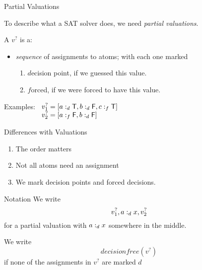 \documentclass[xetex,aspectratio=169,14pt,hyperref={pdfpagelabels=true,pdflang={en-GB}}]{beamer}
\begin{document}
\begin{frame}
  {Partial Valuations}

  To describe what a SAT solver does, we need \emph{partial valuations}.

  \bigskip

  A  $v^?$ is a:
  \begin{itemize}
  \item \emph{sequence} of assignments to atoms; with each one marked
    \begin{enumerate}
    \item $d$ecision point, if we guessed this value.
    \item $f$orced, if we were forced to have this value.
    \end{enumerate}
  \end{itemize}

\medskip

  Examples:
  $\begin{array}[t]{l}
      v_1^? = [ a :_d \mathsf{T}, b :_d \mathsf{F}, c :_f \mathsf{T} ] \\
      v_2^? = [ a :_f \mathsf{F}, b :_d \mathsf{F} ] \\
    \end{array}$
\end{frame}

\begin{frame}
  {Differences with Valuations}

  \begin{enumerate}
  \item The order matters\\
  \item Not all atoms need an assignment\\
  \item We mark decision points and forced decisions.
  \end{enumerate}
\end{frame}

\begin{frame}
  {Notation}
  We write
  \begin{displaymath}
    v_1^?, a :_d x, v_2^?
  \end{displaymath}
  for a partial valuation with $a :_d x$ somewhere in
  the middle.

  \bigskip

  We write
  \begin{displaymath}
    \mathit{decisionfree}(v^?)
  \end{displaymath}
  if none of the assignments in $v^?$ are marked $d$ \\
\end{frame}
\end{document}
